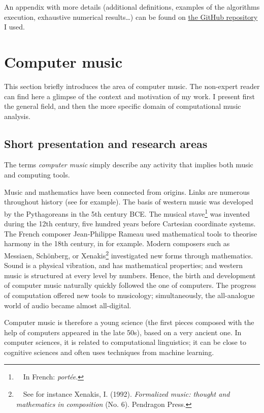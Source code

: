 \documentclass[a4paper,10pt]{article}
\begin{document}
An appendix with more details (additional definitions, examples of the algorithms execution, exhaustive numerical results\dots) can be found on \href{https://github.com/Rometach/aalborg/blob/master/Rapport/appendix.pdf}{the GitHub repository} I used.



\section{Computer music}

This section briefly introduces the area of computer music. The non-expert reader can find here a glimpse of the context and motivation of my work. I present first the general field, and then the more specific domain of computational music analysis.


\subsection{Short presentation and research areas}

The terms \emph{computer music} simply describe any activity that implies both music and computing tools.

Music and mathematics have been connected from origins. Links are numerous throughout history (see \cite{musicmaths} for example). The basis of western music was developed by the Pythagoreans in the 5th century BCE. The musical stave\footnote{~~In French: \emph{portée}.} was invented during the 12th century, five hundred years before Cartesian coordinate systems. The French composer Jean-Philippe Rameau used mathematical tools to theorise harmony in the 18th century, in \cite{rameau} for example. Modern composers such as Messiaen, Schönberg, or Xenakis\footnote{~~See for instance Xenakis, I. (1992). \emph{Formalized music: thought and mathematics in composition} (No. 6). Pendragon Press.} investigated new forms through mathematics. Sound is a physical vibration, and has mathematical properties; and western music is structured at every level by numbers. Hence, the birth and development of computer music naturally quickly followed the one of computers. The progress of computation offered new tools to musicology; simultaneously, the all-analogue world of audio became almost all-digital.

Computer music is therefore a young science (the first pieces composed with the help of computers appeared in the late 50s), based on a very ancient one. In computer sciences, it is related to computational linguistics; it can be close to cognitive sciences and often uses techniques from machine learning.
\end{document}
